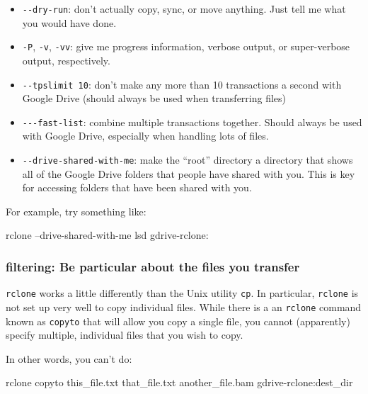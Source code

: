 \documentclass[]{krantz}
\makeatletter
\newenvironment{Shaded}{\begin{snugshade}}{\end{snugshade}}
\newcommand{\ExtensionTok}[1]{#1}
\newcommand{\NormalTok}[1]{#1}
\providecommand{\tightlist}{%
  \setlength{\itemsep}{0pt}\setlength{\parskip}{0pt}}
\newenvironment{kframe}{%
\medskip{}
\setlength{\fboxsep}{.8em}
 \def\at@end@of@kframe{}%
 \ifinner\ifhmode%
  \def\at@end@of@kframe{\end{minipage}}%
  \begin{minipage}{\columnwidth}%
 \fi\fi%
 \def\FrameCommand##1{\hskip\@totalleftmargin \hskip-\fboxsep
 \colorbox{shadecolor}{##1}\hskip-\fboxsep
     \hskip-\linewidth \hskip-\@totalleftmargin \hskip\columnwidth}%
 \MakeFramed {\advance\hsize-\width
   \@totalleftmargin\z@ \linewidth\hsize
   \@setminipage}}%
 {\par\unskip\endMakeFramed%
 \at@end@of@kframe}
\renewenvironment{Shaded}{\begin{kframe}}{\end{kframe}}
\makeatother
\begin{document}
\begin{itemize}
\tightlist
\item
  \texttt{-\/-dry-run}: don't actually copy, sync, or move anything. Just tell me what you would have done.
\item
  \texttt{-P}, \texttt{-v}, \texttt{-vv}: give me progress information, verbose output, or super-verbose output, respectively.
\item
  \texttt{-\/-tpslimit\ 10}: don't make any more than 10 transactions a second with Google Drive (should always be used when transferring files)
\item
  \texttt{-\/-\/-fast-list}: combine multiple transactions together. Should always be used with Google Drive,
  especially when handling lots of files.
\item
  \texttt{-\/-drive-shared-with-me}: make the ``root'' directory a directory that shows all
  of the Google Drive folders that people have shared with you. This is key for accessing
  folders that have been shared with you.
\end{itemize}

For example, try something like:

\begin{Shaded}
\begin{Highlighting}[]
\ExtensionTok{rclone}\NormalTok{ --drive-shared-with-me lsd gdrive-rclone:}
\end{Highlighting}
\end{Shaded}

\hypertarget{rclone-filter}{%
\subsubsection{filtering: Be particular about the files you transfer}\label{rclone-filter}}

\texttt{rclone} works a little differently than the Unix utility \texttt{cp}. In particular,
\texttt{rclone} is not set up very well to copy individual files. While there is a
an \texttt{rclone} command known as \texttt{copyto} that will allow you copy a single file,
you cannot (apparently) specify multiple, individual files that you wish to copy.

In other words, you can't do:

\begin{Shaded}
\begin{Highlighting}[]
\ExtensionTok{rclone}\NormalTok{ copyto this_file.txt that_file.txt another_file.bam gdrive-rclone:dest_dir}
\end{Highlighting}
\end{Shaded}
\end{document}
